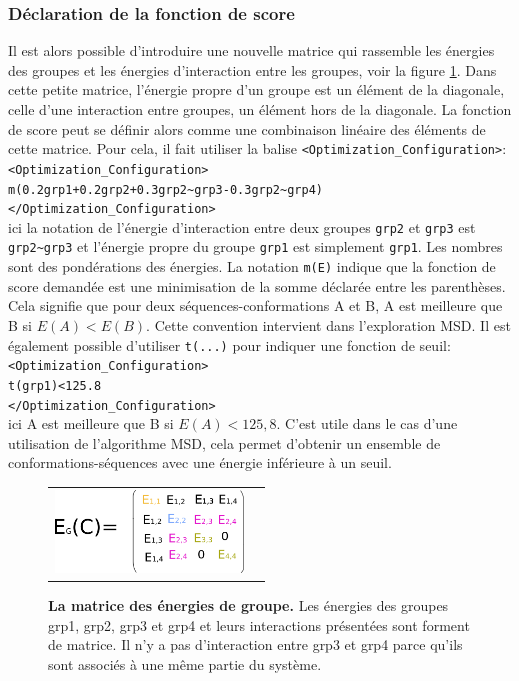 \subsubsection{Déclaration de la fonction de score}
\label{sub:score}
Il est alors possible d'introduire une nouvelle matrice qui rassemble les énergies des groupes et les énergies d'interaction entre les groupes, voir la figure \ref{fig:group_matrix}. Dans cette petite matrice, l'énergie propre d'un groupe est un élément de la diagonale, celle d'une interaction entre groupes, un élément hors de la diagonale. La fonction de score peut se définir alors comme une combinaison linéaire des éléments de cette matrice. Pour cela, il fait utiliser la balise  \verb!<Optimization_Configuration>!:\\
\verb!<Optimization_Configuration>! \\
\verb!m(0.2grp1+0.2grp2+0.3grp2~grp3-0.3grp2~grp4)! \\
\verb!</Optimization_Configuration>! \\
ici la notation de l'énergie d'interaction entre deux groupes \verb!grp2! et \verb!grp3! est \verb!grp2~grp3! et l'énergie propre du groupe \verb!grp1! est simplement \verb!grp1!. Les nombres sont des pondérations des énergies. La notation \verb!m(E)! indique que la fonction de score demandée est une minimisation de la somme déclarée entre les parenthèses. Cela signifie que pour deux séquences-conformations A et B, A est meilleure que B si $E(A) < E(B)$. Cette convention intervient dans l'exploration MSD. Il est également possible d'utiliser \verb!t(...)! pour indiquer une fonction de seuil:\\
\verb!<Optimization_Configuration>! \\
\verb!t(grp1)<125.8! \\
\verb!</Optimization_Configuration>! \\
ici A est meilleure que B si $E(A)<125,8$. C'est utile dans le cas d'une utilisation de l'algorithme MSD, cela permet d'obtenir un ensemble de conformations-séquences avec une énergie inférieure à un seuil.


   \begin{figure}[!htbp]
     \centering
     \begin{tabular}{cc}
       \includegraphics[width=5cm]{figure/group_matrix.png} &
     \end{tabular}
     
     \caption{\textbf{La matrice des énergies de groupe.} Les énergies des groupes grp1, grp2, grp3 et grp4 et leurs interactions présentées sont forment de matrice. Il n'y a pas d'interaction entre grp3 et grp4 parce qu'ils sont associés à une même partie du système.}
\label{fig:group_matrix}
   \end{figure}

